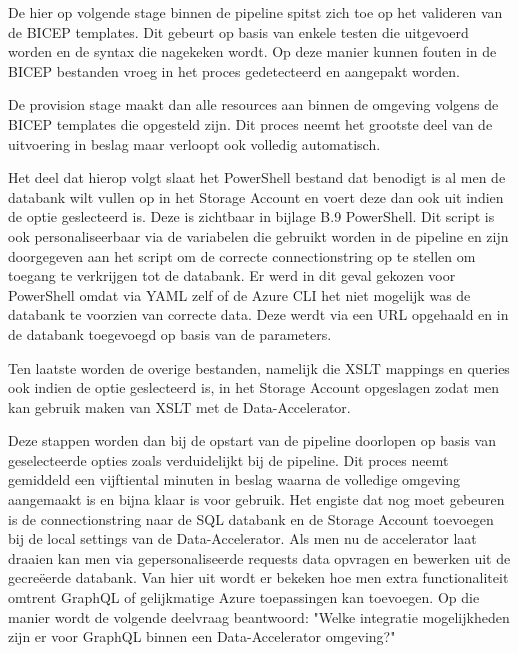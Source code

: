 De hier op volgende stage binnen de pipeline spitst zich toe op het valideren van de BICEP templates. Dit gebeurt op basis van enkele testen die uitgevoerd worden en de syntax die nagekeken wordt. Op deze manier kunnen fouten in de BICEP bestanden vroeg in het proces gedetecteerd en aangepakt worden.

De provision stage maakt dan alle resources aan binnen de omgeving volgens de BICEP templates die opgesteld zijn. Dit proces neemt het grootste deel van de uitvoering in beslag maar verloopt ook volledig automatisch.

Het deel dat hierop volgt slaat het PowerShell bestand dat benodigt is al men de databank wilt vullen op in het Storage Account en voert deze dan ook uit indien de optie geslecteerd is. Deze is zichtbaar in bijlage B.9 PowerShell. Dit script is ook personaliseerbaar via de variabelen die gebruikt worden in de pipeline en zijn doorgegeven aan het script om de correcte connectionstring op te stellen om toegang te verkrijgen tot de databank. Er werd in dit geval gekozen voor PowerShell omdat via YAML zelf of de Azure CLI het niet mogelijk was de databank te voorzien van correcte data. Deze werdt via een URL opgehaald en in de databank toegevoegd op basis van de parameters.

Ten laatste worden de overige bestanden, namelijk die XSLT mappings en queries ook indien de optie geslecteerd is, in het Storage Account opgeslagen zodat men kan gebruik maken van XSLT met de Data-Accelerator.

Deze stappen worden dan bij de opstart van de pipeline doorlopen op basis van geselecteerde opties zoals verduidelijkt bij de pipeline. Dit proces neemt gemiddeld een vijftiental minuten in beslag waarna de volledige omgeving aangemaakt is en bijna klaar is voor gebruik.
Het engiste dat nog moet gebeuren is de connectionstring naar de SQL databank en de Storage Account toevoegen bij de local settings van de Data-Accelerator. Als men nu de accelerator laat draaien kan men via gepersonaliseerde requests data opvragen en bewerken uit de gecreëerde databank. Van hier uit wordt er bekeken hoe men extra functionaliteit omtrent GraphQL of gelijkmatige Azure toepassingen kan toevoegen. Op die manier wordt de volgende deelvraag beantwoord: "Welke integratie mogelijkheden zijn er voor GraphQL binnen een Data-Accelerator omgeving?"

\subsection{}%
\label{sec:Implementatie GraphQL}

